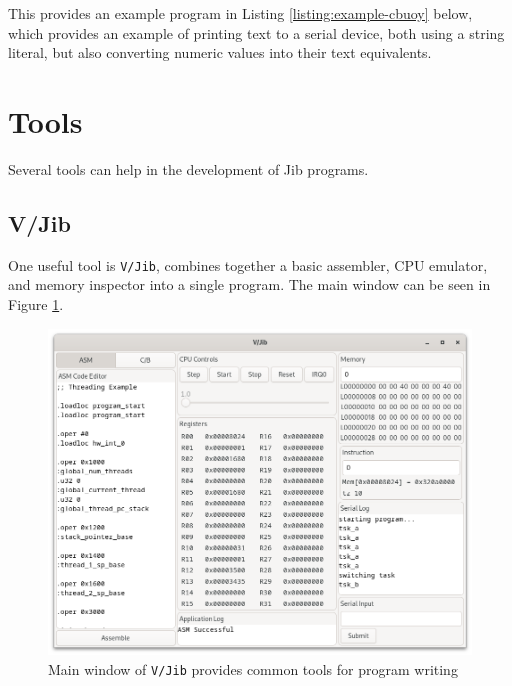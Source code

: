 \documentclass{article}
\begin{document}
This provides an example program in Listing \ref{listing:example-cbuoy} below, which provides an example of printing text to a serial device, both using a string literal, but also converting numeric values into their text equivalents.



\pagebreak

\section{Tools}

Several tools can help in the development of Jib programs.

\subsection{V/Jib}

One useful tool is \texttt{V/Jib}, combines together a basic assembler, CPU emulator, and memory inspector into a single program. The main window can be seen in Figure \ref{fig:visual-jib-main-page}.

\begin{figure}[h!]
    \centering
    \includegraphics[width=5in]{images/visual-jib.png}
    \caption{Main window of \texttt{V/Jib} provides common tools for program writing}
    \label{fig:visual-jib-main-page}
\end{figure}
\end{document}

